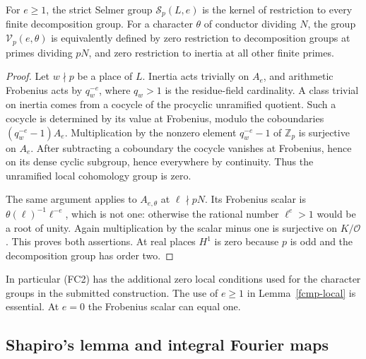 \begin{lemma}\label{fcmp-local}
For $e\ge1$, the strict Selmer group $\mathcal S_p(L,e)$
is the kernel of restriction to every finite decomposition
group. For a character $\theta$ of conductor dividing $N$,
the group $\mathcal V_p(e,\theta)$ is equivalently defined
by zero restriction to decomposition groups at primes
dividing $pN$, and zero restriction to inertia at all
other finite primes.
\end{lemma}
\begin{proof}
Let $w\nmid p$ be a place of $L$. Inertia acts trivially on
$A_e$, and arithmetic Frobenius acts by $q_w^{-e}$, where
$q_w>1$ is the residue-field cardinality. A class trivial
on inertia comes from a cocycle of the procyclic unramified
quotient. Such a cocycle is determined by its value at
Frobenius, modulo the coboundaries
$(q_w^{-e}-1)A_e$. Multiplication by the nonzero
element $q_w^{-e}-1$ of $\mathbb Z_p$ is surjective on $A_e$.
After subtracting a coboundary the cocycle vanishes at
Frobenius, hence on its dense cyclic subgroup, hence
everywhere by continuity. Thus the unramified local
cohomology group is zero.

The same argument applies to $A_{e,\theta}$ at
$\ell\nmid pN$. Its Frobenius scalar is
$\theta(\ell)^{-1}\ell^{-e}$, which is not one: otherwise
the rational number $\ell^e>1$ would be a root of unity.
Again multiplication by the scalar minus one is
surjective on $K/\mathcal O$. This proves both assertions.
At real places $H^1$ is zero because $p$ is odd and the
decomposition group has order two.
\end{proof}

In particular (FC2) has the additional zero local conditions
used for the character groups in the submitted construction.
The use of $e\ge1$ in Lemma~\ref{fcmp-local} is essential.
At $e=0$ the Frobenius scalar can equal one.

\subsection{Shapiro's lemma and integral Fourier maps}

